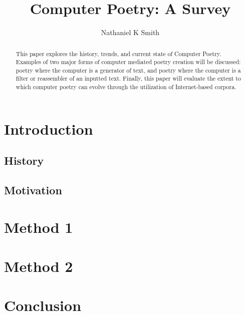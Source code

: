 \documentclass[10pt]{article}
\title{Computer Poetry: A Survey}
\author{Nathaniel K Smith}
\begin{document}
\maketitle

\begin{abstract}
This paper explores the history, trends, and current state of Computer Poetry.
Examples of two major forms of computer mediated poetry creation will be
discussed: poetry where the computer is a generator of text, and poetry where
the computer is a filter or reassembler of an inputted text. Finally, this
paper will evaluate the extent to which computer poetry can evolve through the
utilization of Internet-based corpora.\cite{Hart96}
\end{abstract}

\section{Introduction}
\subsection{History}
\subsection{Motivation}
\section{Method 1}
\section{Method 2}
\section{Conclusion}



\end{document}
